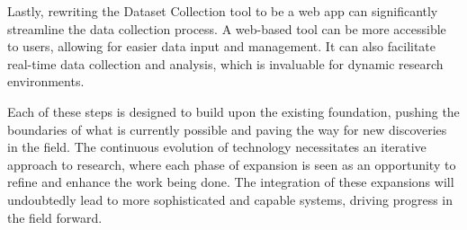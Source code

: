 \begin{spacing}{1.5}
\begin{sloppypar}
Lastly, rewriting the Dataset Collection tool to be a web app can significantly streamline the data collection process. A web-based tool can be more accessible to users, allowing for easier data input and management. It can also facilitate real-time data collection and analysis, which is invaluable for dynamic research environments.

Each of these steps is designed to build upon the existing foundation, pushing the boundaries of what is currently possible and paving the way for new discoveries in the field. The continuous evolution of technology necessitates an iterative approach to research, where each phase of expansion is seen as an opportunity to refine and enhance the work being done. The integration of these expansions will undoubtedly lead to more sophisticated and capable systems, driving progress in the field forward.
 \end{sloppypar}
 \end{spacing}